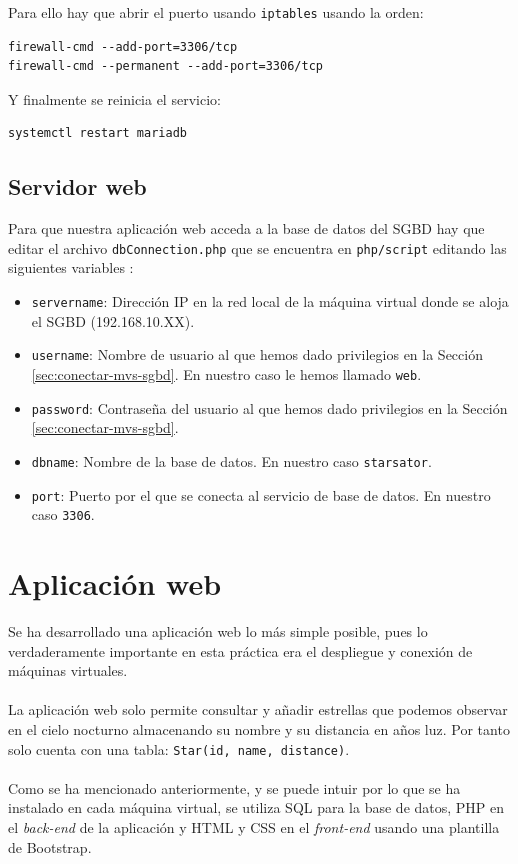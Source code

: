 Para ello hay que abrir el puerto usando \texttt{iptables} \cite{EnableRemoteAccessToMySQL} usando la orden:

\begin{lstlisting}
firewall-cmd --add-port=3306/tcp 
firewall-cmd --permanent --add-port=3306/tcp
\end{lstlisting}

Y finalmente se reinicia el servicio: 

\begin{lstlisting}
systemctl restart mariadb
\end{lstlisting}

\subsection{Servidor web}

Para que nuestra aplicación web acceda a la base de datos del SGBD hay que editar el archivo \texttt{dbConnection.php} que se encuentra en \texttt{php/script} editando las siguientes variables \cite{PHPRemoteMySQLConnection}:

\begin{itemize}
	\item \texttt{servername}: Dirección IP en la red local de la máquina virtual donde se aloja el SGBD (192.168.10.XX).
	\item \texttt{username}: Nombre de usuario al que hemos dado privilegios en la Sección \ref{sec:conectar-mvs-sgbd}. En nuestro caso le hemos llamado \texttt{web}.
	\item \texttt{password}: Contraseña del usuario al que hemos dado privilegios en la Sección \ref{sec:conectar-mvs-sgbd}.
	\item \texttt{dbname}: Nombre de la base de datos. En nuestro caso \texttt{starsator}.
	\item \texttt{port}: Puerto por el que se conecta al servicio de base de datos. En nuestro caso \texttt{3306}.
\end{itemize}

\section{Aplicación web}

Se ha desarrollado una aplicación web lo más simple posible, pues lo verdaderamente importante en esta práctica era el despliegue y conexión de máquinas virtuales.
\\ \\
La aplicación web solo permite consultar y añadir estrellas que podemos observar en el cielo nocturno almacenando su nombre y su distancia en años luz. Por tanto solo cuenta con una tabla: \texttt{Star(id, name, distance)}.
\\ \\
Como se ha mencionado anteriormente, y se puede intuir por lo que se ha instalado en cada máquina virtual, se utiliza SQL para la base de datos, PHP en el \textit{back-end} de la aplicación y HTML y CSS en el \textit{front-end} usando una plantilla de Bootstrap.

